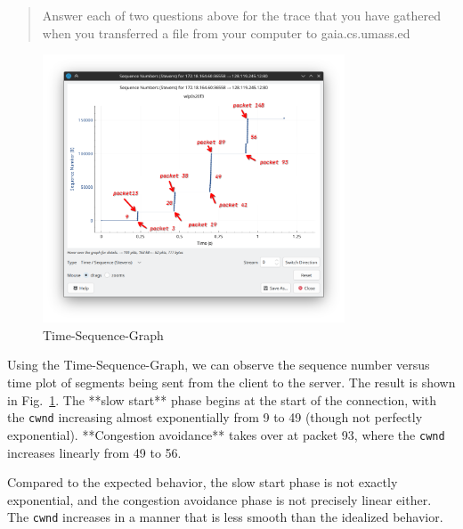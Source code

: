\documentclass{cshwk}
\begin{document}
\begin{quote}
    Answer each of two questions above for the trace that you have gathered when you transferred a file from your computer to gaia.cs.umass.ed
\end{quote}


\begin{figure}[htbp]
    \centering
    \includegraphics[width=0.8\textwidth]{./lab3-12.png}
    \caption{Time-Sequence-Graph}
    \label{fig:TSG}
\end{figure}

Using the Time-Sequence-Graph, we can observe the sequence number versus time plot of segments being sent from the client to the server. The result is shown in Fig.~\ref{fig:TSG}. The **slow start** phase begins at the start of the connection, with the \texttt{cwnd} increasing almost exponentially from 9 to 49 (though not perfectly exponential). **Congestion avoidance** takes over at packet 93, where the \texttt{cwnd} increases linearly from 49 to 56.

Compared to the expected behavior, the slow start phase is not exactly exponential, and the congestion avoidance phase is not precisely linear either. The \texttt{cwnd} increases in a manner that is less smooth than the idealized behavior.
\end{document}
